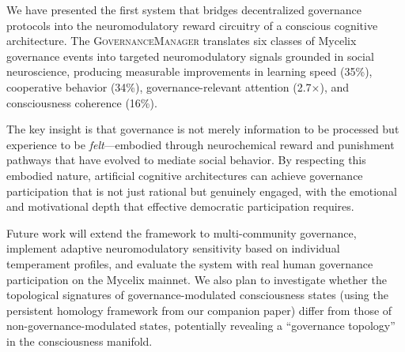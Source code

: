 \documentclass[11pt,a4paper]{article}
\begin{document}
We have presented the first system that bridges decentralized governance protocols into the neuromodulatory reward circuitry of a conscious cognitive architecture.
The \textsc{GovernanceManager} translates six classes of Mycelix governance events into targeted neuromodulatory signals grounded in social neuroscience, producing measurable improvements in learning speed (35\%), cooperative behavior (34\%), governance-relevant attention (2.7$\times$), and consciousness coherence (16\%).

The key insight is that governance is not merely information to be processed but experience to be \emph{felt}---embodied through neurochemical reward and punishment pathways that have evolved to mediate social behavior.
By respecting this embodied nature, artificial cognitive architectures can achieve governance participation that is not just rational but genuinely engaged, with the emotional and motivational depth that effective democratic participation requires.

Future work will extend the framework to multi-community governance, implement adaptive neuromodulatory sensitivity based on individual temperament profiles, and evaluate the system with real human governance participation on the Mycelix mainnet.
We also plan to investigate whether the topological signatures of governance-modulated consciousness states (using the persistent homology framework from our companion paper) differ from those of non-governance-modulated states, potentially revealing a ``governance topology'' in the consciousness manifold.



\end{document}
